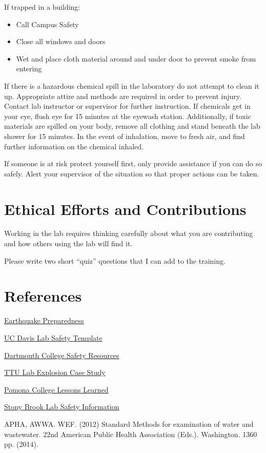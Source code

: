 \documentclass[12pt]{../SOP4_alpha}\usepackage[]{graphicx}\usepackage[]{xcolor}
\begin{document}
\NP If trapped in a building:
\begin{itemize}
  \item Call Campus Safety
  \item Close all windows and doors
  \item Wet and place cloth material around and under door to prevent smoke from entering
\end{itemize}

\NP If there is a hazardous chemical spill in the laboratory do not attempt to clean it up.  Appropriate attire and methods are required in order to prevent injury.  Contact lab instructor or supervisor for further instruction. If chemicals get in your eye, flush eye for 15 minutes at the eyewash station.  Additionally, if toxic materials are spilled on your body, remove all clothing and stand beneath the lab shower for 15 minutes. In the event of inhalation, move to fresh air, and find further information on the chemical inhaled.  

\NP If someone is at risk protect yourself first, only provide assistance if you can do so safely.  Alert your supervisor of the situation so that proper actions can be taken.

\section{Ethical Efforts and Contributions}

\NP Working in the lab requires thinking carefully about what you are contributing and how others using the lab will find it. 

\NP Please write two short ``quiz'' questions that I can add to the training. 

\section{References}

\NP \href{http://emergency.cdc.gov/disasters/earthquakes/prepared.asp}{Earthquake Preparedness}

\NP \href{http://safetyservices.ucdavis.edu/sites/default/files/documents/LabSafetyPlan_Template.docx}{UC Davis Lab Safety Template}

\NP \href{https://www.dartmouth.edu/~chemlab/info/safety/hazards.html}{Dartmouth College Safety Resources}

\NP \href{http://www.csb.gov/file.aspx?DocumentId=420}{TTU Lab Explosion Case Study}

\NP \href{https://sakai.claremont.edu/access/content/group/CX_mtg_87013/Project%201%3A%20Lab%20and%20Field%20Safety/Lessons%20Learned/Lesson_Learned_Report.pdf}{Pomona College Lessons Learned}

\NP \href{https://ehs.stonybrook.edu/programs/laboratory-safety}{Stony Brook Lab Safety Information}

\NP APHA, AWWA. WEF. (2012) Standard Methods for examination of water and wastewater. 22nd American Public Health Association (Eds.). Washington. 1360 pp. (2014).
\end{document}
